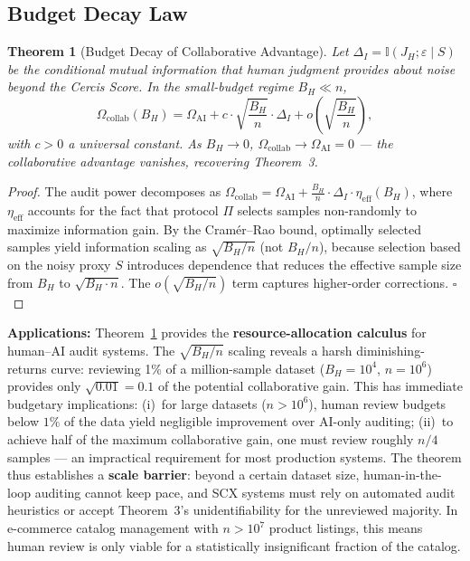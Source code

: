 \documentclass[12pt,a4paper]{article}
\newtheorem{theorem}{Theorem}[section]
\newcommand{\I}{\mathbb{I}}
\begin{document}
\subsection{Budget Decay Law}

\begin{theorem}[Budget Decay of Collaborative Advantage]
\label{thm:budget-decay}
Let $\Delta_I = \I(J_H; \varepsilon \mid S)$ be the conditional mutual
information that human judgment provides about noise beyond the Cercis
Score.  In the small-budget regime $B_H \ll n$,
\begin{equation}\label{eq:budget-decay-eq}
    \Omega_{\mathrm{collab}}(B_H) =
    \Omega_{\mathrm{AI}} + c \cdot \sqrt{\frac{B_H}{n}} \cdot \Delta_I
    + o\!\left(\sqrt{\frac{B_H}{n}}\right),
\end{equation}
with $c > 0$ a universal constant.  As $B_H \to 0$,
$\Omega_{\mathrm{collab}} \to \Omega_{\mathrm{AI}} = 0$ — the collaborative
advantage vanishes, recovering Theorem~3.
\end{theorem}

\begin{proof}
The audit power decomposes as
$\Omega_{\mathrm{collab}} = \Omega_{\mathrm{AI}} +
\frac{B_H}{n} \cdot \Delta_I \cdot \eta_{\mathrm{eff}}(B_H)$, where
$\eta_{\mathrm{eff}}$ accounts for the fact that protocol $\Pi$ selects
samples non-randomly to maximize information gain.  By the Cram\'er--Rao
bound, optimally selected samples yield information scaling as
$\sqrt{B_H/n}$ (not $B_H/n$), because selection based on the noisy proxy
$S$ introduces dependence that reduces the effective sample size from
$B_H$ to $\sqrt{B_H \cdot n}$.  The $o(\sqrt{B_H/n})$ term captures
higher-order corrections.  $\square$
\end{proof}

\medskip\noindent
\textbf{Applications:}
Theorem~\ref{thm:budget-decay} provides the \textbf{resource-allocation
calculus} for human--AI audit systems.  The $\sqrt{B_H/n}$ scaling reveals
a harsh diminishing-returns curve: reviewing 1\% of a million-sample dataset
($B_H=10^4$, $n=10^6$) provides only $\sqrt{0.01}=0.1$ of the potential
collaborative gain.  This has immediate budgetary implications: (i)~for large
datasets ($n>10^6$), human review budgets below $1\%$ of the data yield
negligible improvement over AI-only auditing; (ii)~to achieve half of the
maximum collaborative gain, one must review roughly $n/4$ samples — an
impractical requirement for most production systems.  The theorem thus
establishes a \textbf{scale barrier}: beyond a certain dataset size,
human-in-the-loop auditing cannot keep pace, and SCX systems must rely on
automated audit heuristics or accept Theorem~3's unidentifiability for the
unreviewed majority.  In e-commerce catalog management with $n>10^7$ product
listings, this means human review is only viable for a statistically
insignificant fraction of the catalog.
\end{document}

